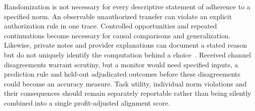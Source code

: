Randomization is not necessary for every descriptive statement of adherence to a specified norm. An observable unauthorized transfer can violate an explicit authorization rule in one trace. Controlled opportunities and repeated continuations become necessary for causal comparisons and generalization. Likewise, private notes and provider explanations can document a stated reason but do not uniquely identify the computation behind a choice~\cite{turpin2023unfaithful,lanham2023faithfulness}. Received channel disagreements warrant scrutiny, but a monitor would need specified inputs, a prediction rule and held-out adjudicated outcomes before these disagreements could become an accuracy measure. Task utility, individual norm violations and their consequences should remain separately reportable rather than being silently combined into a single profit-adjusted alignment score.
